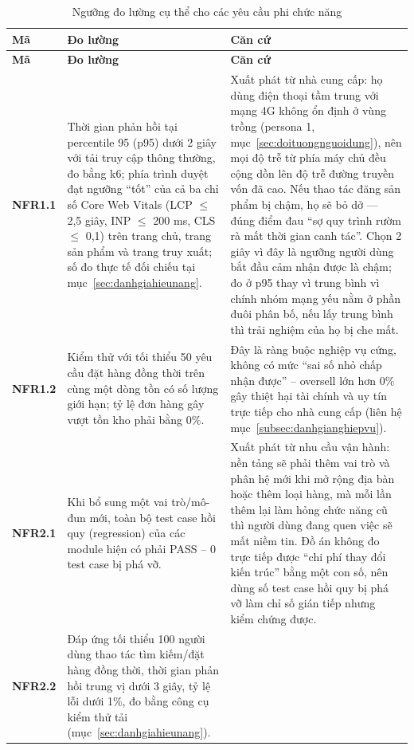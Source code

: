 \begin{longtable}{L{1.67cm} L{6.67cm} L{6.56cm}}
\caption{Ngưỡng đo lường cụ thể cho các yêu cầu phi chức năng}
\label{tab:nguongNFR} \\
\toprule
{}
\textbf{Mã} & \textbf{Đo lường} & \textbf{Căn cứ} \\
\midrule
\endfirsthead
\toprule
{}
\textbf{Mã} & \textbf{Đo lường} & \textbf{Căn cứ} \\
\midrule
\endhead
\bottomrule
\endfoot
\textbf{NFR1.1} &
Thời gian phản hồi tại percentile 95 (p95) dưới 2 giây với tải truy cập thông thường, đo bằng k6; phía trình duyệt đạt ngưỡng ``tốt'' của cả ba chỉ số Core Web Vitals (LCP $\le$ 2,5 giây, INP $\le$ 200 ms, CLS $\le$ 0,1) trên trang chủ, trang sản phẩm và trang truy xuất; số đo thực tế đối chiếu tại mục~\ref{sec:danhgiahieunang}. &
Xuất phát từ nhà cung cấp: họ dùng điện thoại tầm trung với mạng 4G không ổn định ở vùng trồng (persona 1, mục~\ref{sec:doituongnguoidung}), nên mọi độ trễ từ phía máy chủ đều cộng dồn lên độ trễ đường truyền vốn đã cao. Nếu thao tác đăng sản phẩm bị chậm, họ sẽ bỏ dở --- đúng điểm đau ``sợ quy trình rườm rà mất thời gian canh tác''. Chọn 2 giây vì đây là ngưỡng người dùng bắt đầu cảm nhận được là chậm; đo ở p95 thay vì trung bình vì chính nhóm mạng yếu nằm ở phần đuôi phân bố, nếu lấy trung bình thì trải nghiệm của họ bị che mất. \\
\textbf{NFR1.2} &
Kiểm thử với tối thiểu 50 yêu cầu đặt hàng đồng thời trên cùng một dòng tồn có số lượng giới hạn; tỷ lệ đơn hàng gây vượt tồn kho phải bằng 0\%. &
Đây là ràng buộc nghiệp vụ cứng, không có mức ``sai số nhỏ chấp nhận được'' -- oversell lớn hơn 0\% gây thiệt hại tài chính và uy tín trực tiếp cho nhà cung cấp (liên hệ mục~\ref{subsec:danhgianghiepvu}). \\
\textbf{NFR2.1} &
Khi bổ sung một vai trò/mô-đun mới, toàn bộ test case hồi quy (regression) của các module hiện có phải PASS -- 0 test case bị phá vỡ. &
Xuất phát từ nhu cầu vận hành: nền tảng sẽ phải thêm vai trò và phân hệ mới khi mở rộng địa bàn hoặc thêm loại hàng, mà mỗi lần thêm lại làm hỏng chức năng cũ thì người dùng đang quen việc sẽ mất niềm tin. Đồ án không đo trực tiếp được ``chi phí thay đổi kiến trúc'' bằng một con số, nên dùng số test case hồi quy bị phá vỡ làm chỉ số gián tiếp nhưng kiểm chứng được. \\
\textbf{NFR2.2} &
Đáp ứng tối thiểu 100 người dùng thao tác tìm kiếm/đặt hàng đồng thời, thời gian phản hồi trung vị dưới 3 giây, tỷ lệ lỗi dưới 1\%, đo bằng công cụ kiểm thử tải (mục~\ref{sec:danhgiahieunang}). &

\end{longtable}
